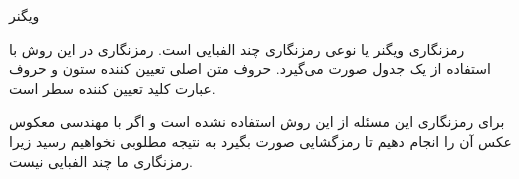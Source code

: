 \SubProblem
{ویگنر}
{
رمزنگاری ویگنر یا
نوعی رمزنگاری چند الفبایی است.
رمزنگاری در این روش با استفاده از یک جدول صورت می‌گیرد.
حروف متن اصلی تعیین کننده ستون و حروف عبارت کلید تعیین کننده سطر است.

برای رمزنگاری این مسئله از این روش استفاده نشده است و اگر با مهندسی معکوس عکس آن را انجام دهیم تا رمزگشایی صورت بگیرد به نتیجه مطلوبی نخواهیم رسید زیرا رمزنگاری ما چند الفبایی نیست.
}
